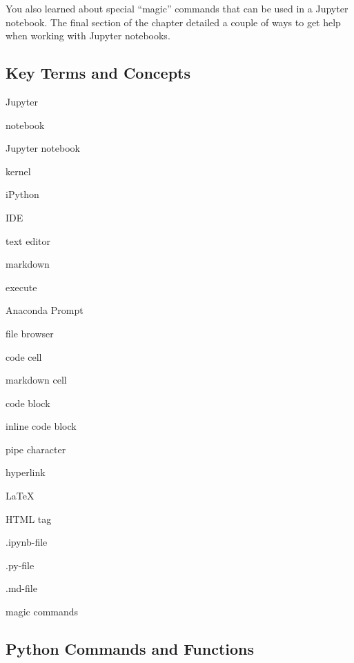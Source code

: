 \documentclass{book}
\newenvironment{key_terms}{\begin{multicols}{3}}{\end{multicols}} %
\begin{document}
You also learned about special ``magic'' commands that can be used in a
Jupyter notebook. The final section of the chapter detailed a couple of
ways to get help when working with Jupyter notebooks.
    




    
        \hypertarget{key-terms-and-concepts}{%
\subsection{Key Terms and Concepts}\label{key-terms-and-concepts}}
    




    
        \begin{key_terms}
        Jupyter

notebook

Jupyter notebook

kernel

iPython

IDE

text editor

markdown

execute

Anaconda Prompt

file browser

code cell

markdown cell

code block

inline code block

pipe character

hyperlink

LaTeX

HTML tag

.ipynb-file

.py-file

.md-file

magic commands
        \end{key_terms}

    




    
        \hypertarget{python-commands-and-functions}{%
\subsection{Python Commands and
Functions}\label{python-commands-and-functions}}
    
\end{document}
